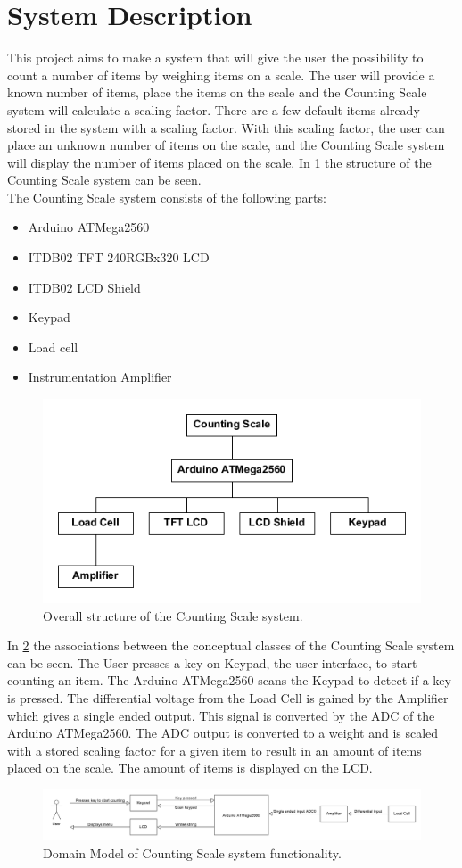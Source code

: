 \section{System Description}
This project aims to make a system that will give the user the possibility to count a number of items by weighing items on a scale. 
The user will provide a known number of items, place the items on the scale and the Counting Scale system will calculate a scaling factor. 
There are a few default items already stored in the system with a scaling factor.
With this scaling factor, the user can place an unknown number of items on the scale, and the Counting Scale system will display the number of items placed on the scale. 
In \cref{fig:system} the structure of the Counting Scale system can be seen. \\

\noindent The Counting Scale system consists of the following parts:
\begin{itemize}
	\item Arduino ATMega2560
	\item ITDB02 TFT 240RGBx320 LCD
	\item ITDB02 LCD Shield
	\item Keypad
	\item Load cell
	\item Instrumentation Amplifier
\end{itemize}

\begin{figure}[H]
	\centering
	\includegraphics[width=0.6\linewidth]{graphics/system}
	\caption{Overall structure of the Counting Scale system.}
	\label{fig:system}
\end{figure}
\newpage

\noindent In \cref{fig:domainmodel} the associations between the conceptual classes of the Counting Scale system can be seen. 
The User presses a key on Keypad, the user interface, to start counting an item. 
The Arduino ATMega2560 scans the Keypad to detect if a key is pressed. 
The differential voltage from the Load Cell is gained by the Amplifier which gives a single ended output.
This signal is converted by the ADC of the Arduino ATMega2560.
The ADC output is converted to a weight and is scaled with a stored scaling factor for a given item to result in an amount of items placed on the scale.
The amount of items is displayed on the LCD.
\begin{figure}[H]
	\centering
	\includegraphics[width=\linewidth]{graphics/domainmodel}
	\caption{Domain Model of Counting Scale system functionality.}
	\label{fig:domainmodel}
\end{figure}